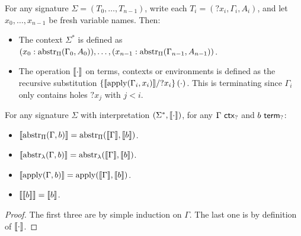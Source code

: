 \documentclass[twoside]{report}
\begin{document}
\begin{definition}
    \label{def:hole_signature_interpretations}
    For any signature $\Sigma = (T_0, \ldots, T_{n-1})$, write each $T_i = ({?x_i}, \Gamma_i, A_i)$, and let $x_0, \ldots, x_{n-1}$ be fresh variable names. Then:
    \begin{itemize}[noitemsep]
        \item The context $\Sigma^\ast$ is defined as $(x_0 : \abstr_\Pi(\Gamma_0, A_0)), \ldots, (x_{n-1} : \abstr_\Pi(\Gamma_{n-1}, A_{n-1}))$.
        \item The operation $\inter\cdot$ on terms, contexts or environments is defined as the recursive substitution $\subst {?x_i} {\inter{\apply(\Gamma_i, x_i)}} {(\cdot)}$. This is terminating since $\Gamma_i$ only contains holes $?x_j$ with $j < i$.
    \end{itemize}
\end{definition}

\begin{proposition}
    \label{thm:hole_interpretation_across_abstr_apply}
    For any signature $\Sigma$ with interpretation $(\Sigma^\ast, \inter\cdot)$, for any $\Gamma \ctxh$ and $b \termh$:
    \begin{itemize}[noitemsep]
        \item $\inter{\abstr_\Pi(\Gamma, b)} = \abstr_\Pi(\inter \Gamma, \inter b)$.
        \item $\inter{\abstr_\lambda(\Gamma, b)} = \abstr_\lambda(\inter \Gamma, \inter b)$.
        \item $\inter{\apply(\Gamma, b)} = \apply(\inter \Gamma, \inter b)$.
        \item $\inter{\inter b} = \inter b$.
    \end{itemize}
\end{proposition}

\begin{proof}
    The first three are by simple induction on $\Gamma$. The last one is by definition of $\inter\cdot$.
\end{proof}
\end{document}
